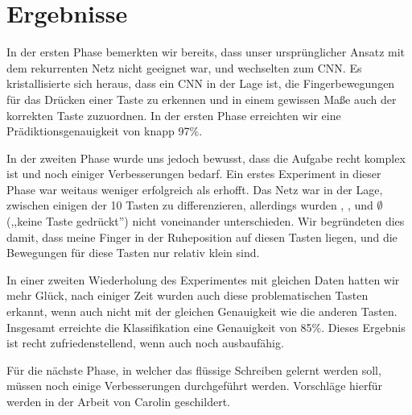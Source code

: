 \section{Ergebnisse}

In der ersten Phase bemerkten wir bereits, dass unser ursprünglicher Ansatz mit
dem rekurrenten Netz nicht geeignet war, und wechselten zum CNN.  Es
kristallisierte sich heraus, dass ein CNN in der Lage ist, die Fingerbewegungen
für das Drücken einer Taste zu erkennen und in einem gewissen Maße auch der
korrekten Taste zuzuordnen. In der ersten Phase erreichten wir eine
Prädiktionsgenauigkeit von knapp 97\%.

In der zweiten Phase wurde uns jedoch bewusst, dass die Aufgabe recht komplex
ist und noch einiger Verbesserungen bedarf. Ein erstes Experiment in dieser
Phase war weitaus weniger erfolgreich als erhofft. Das Netz war in der Lage,
zwischen einigen der 10 Tasten zu differenzieren, allerdings wurden
, , \keyboard{\spacebar} und $\emptyset$ (,,keine Taste
gedrückt'') nicht voneinander unterschieden. Wir begründeten dies damit, dass
meine Finger in der Ruheposition auf diesen Tasten liegen, und die Bewegungen
für diese Tasten nur relativ klein sind.

In einer zweiten Wiederholung des Experimentes mit gleichen Daten hatten wir
mehr Glück, nach einiger Zeit wurden auch diese problematischen Tasten erkannt,
wenn auch nicht mit der gleichen Genauigkeit wie die anderen Tasten. Insgesamt
erreichte die Klassifikation eine Genauigkeit von 85\%. Dieses Ergebnis ist
recht zufriedenstellend, wenn auch noch ausbaufähig.

Für die nächste Phase, in welcher das flüssige Schreiben gelernt werden soll,
müssen noch einige Verbesserungen durchgeführt werden. Vorschläge hierfür
werden in der Arbeit von Carolin \citet*{caro} geschildert.

